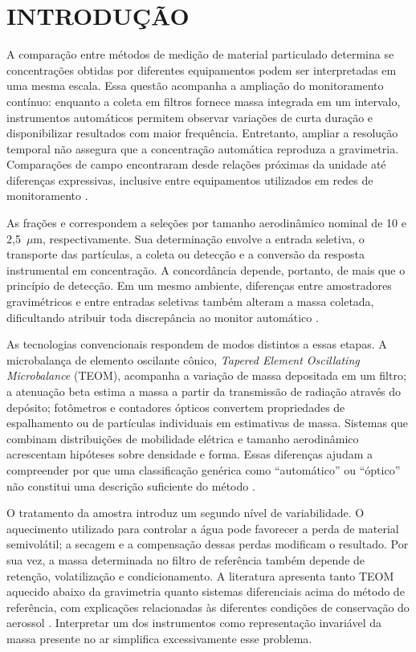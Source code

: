 \section{INTRODUÇÃO}

A comparação entre métodos de medição de material particulado determina se concentrações obtidas por diferentes equipamentos podem ser interpretadas em uma mesma escala. Essa questão acompanha a ampliação do monitoramento contínuo: enquanto a coleta em filtros fornece massa integrada em um intervalo, instrumentos automáticos permitem observar variações de curta duração e disponibilizar resultados com maior frequência. Entretanto, ampliar a resolução temporal não assegura que a concentração automática reproduza a gravimetria. Comparações de campo encontraram desde relações próximas da unidade até diferenças expressivas, inclusive entre equipamentos utilizados em redes de monitoramento \parencite{rsl194,rsl095,rsl105,rsl026}.

As frações \MPdez{} e \MPdoiscinco{} correspondem a seleções por tamanho aerodinâmico nominal de 10 e 2,5~\ensuremath{\mu\mathrm{m}}, respectivamente. Sua determinação envolve a entrada seletiva, o transporte das partículas, a coleta ou detecção e a conversão da resposta instrumental em concentração. A concordância depende, portanto, de mais que o princípio de detecção. Em um mesmo ambiente, diferenças entre amostradores gravimétricos e entre entradas seletivas também alteram a massa coletada, dificultando atribuir toda discrepância ao monitor automático \parencite{rsl129,rsl136,rsl106}.

As tecnologias convencionais respondem de modos distintos a essas etapas. A microbalança de elemento oscilante cônico, \textit{Tapered Element Oscillating Microbalance} (TEOM), acompanha a variação de massa depositada em um filtro; a atenuação beta estima a massa a partir da transmissão de radiação através do depósito; fotômetros e contadores ópticos convertem propriedades de espalhamento ou de partículas individuais em estimativas de massa. Sistemas que combinam distribuições de mobilidade elétrica e tamanho aerodinâmico acrescentam hipóteses sobre densidade e forma. Essas diferenças ajudam a compreender por que uma classificação genérica como \enquote{automático} ou \enquote{óptico} não constitui uma descrição suficiente do método \parencite{rsl214,rsl288,rsl283,rsl388}.

O tratamento da amostra introduz um segundo nível de variabilidade. O aquecimento utilizado para controlar a água pode favorecer a perda de material semivolátil; a secagem e a compensação dessas perdas modificam o resultado. Por sua vez, a massa determinada no filtro de referência também depende de retenção, volatilização e condicionamento. A literatura apresenta tanto TEOM aquecido abaixo da gravimetria quanto sistemas diferenciais acima do método de referência, com explicações relacionadas às diferentes condições de conservação do aerossol \parencite{rsl201,rsl144,rsl101,rsl202}. Interpretar um dos instrumentos como representação invariável da massa presente no ar simplifica excessivamente esse problema.


